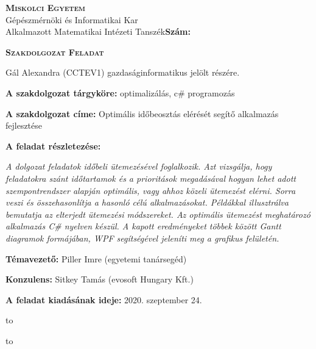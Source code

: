\begin{flushleft}
\textsc{\bfseries Miskolci Egyetem}\\
Gépészmérnöki és Informatikai Kar\\
Alkalmazott Matematikai Intézeti Tanszék\hspace*{4cm}\hfil \textbf{Szám:}
\end{flushleft}
\vskip 0.5cm
\begin{center}
\large\textsc{\bfseries Szakdolgozat Feladat}
\end{center}
\vskip 0.5cm
Gál Alexandra (CCTEV1) gazdaságinformatikus jelölt részére.\newline

\noindent\textbf{A szakdolgozat tárgyköre:} optimalizálás, c\# programozás\newline

\noindent\textbf{A szakdolgozat címe:} Optimális időbeosztás elérését segítő alkalmazás fejlesztése\newline

\noindent\textbf{A feladat részletezése:}

\medskip

\emph{A dolgozat feladatok időbeli ütemezésével foglalkozik. Azt vizsgálja, hogy feladatokra szánt időtartamok és a prioritások megadásával hogyan lehet adott szempontrendszer alapján optimális, vagy ahhoz közeli ütemezést elérni. Sorra veszi és összehasonlítja a hasonló célú alkalmazásokat. Példákkal illusztrálva bemutatja az elterjedt ütemezési módszereket. Az optimális ütemezést meghatározó alkalmazás C\# nyelven készül. A kapott eredményeket többek között Gantt diagramok formájában, WPF segítségével jeleníti meg a grafikus felületén.}

\vfill

\noindent\textbf{Témavezető:} Piller Imre (egyetemi tanársegéd) \newline

\noindent\textbf{Konzulens:} Sitkey Tamás (evosoft Hungary Kft.) \newline

\noindent\textbf{A feladat kiadásának ideje:} 2020. szeptember 24.\newline


\vskip 2cm

\hbox to 

\hbox to 

